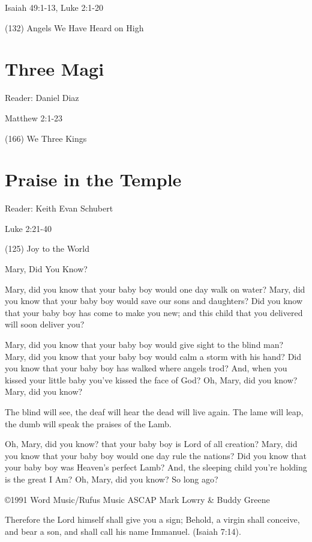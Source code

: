 \documentclass{article}
\begin{document}
Isaiah 49:1-13, Luke 2:1-20

(132) Angels We Have Heard on High

\section{Three Magi}
Reader: Daniel Diaz

Matthew 2:1-23

(166) We Three Kings

\section{Praise in the Temple}
Reader: Keith Evan Schubert

Luke 2:21-40

(125) Joy to the World


\pagebreak


Mary, Did You Know?

Mary, did you know that your baby boy
would one day walk on water?
Mary, did you know that your baby boy
would save our sons and daughters?
Did you know that your baby boy
has come to make you new;
and this child that you delivered
will soon deliver you?

Mary, did you know that your baby boy
would give sight to the blind man?
Mary, did you know that your baby boy
would calm a storm with his hand?
Did you know that your baby boy
has walked where angels trod?
And, when you kissed your little baby
you've kissed the face of God?
Oh, Mary, did you know?
Mary, did you know?

The blind will see, the deaf will hear
the dead will live again.
The lame will leap,
the dumb will speak the praises of the Lamb.

Oh, Mary, did you know?
that your baby boy is Lord of all creation?
Mary, did you know that your baby boy
would one day rule the nations?
Did you know that your baby boy
was Heaven's perfect Lamb?
And, the sleeping child you're holding is the great I Am?
Oh, Mary, did you know?
So long ago?


\copyright 1991 Word Music/Rufus Music ASCAP Mark Lowry \& Buddy Greene




Therefore the Lord himself shall give you a sign; Behold, a virgin shall
conceive, and bear a son, and shall call his name Immanuel. (Isaiah 7:14).
\end{document}
